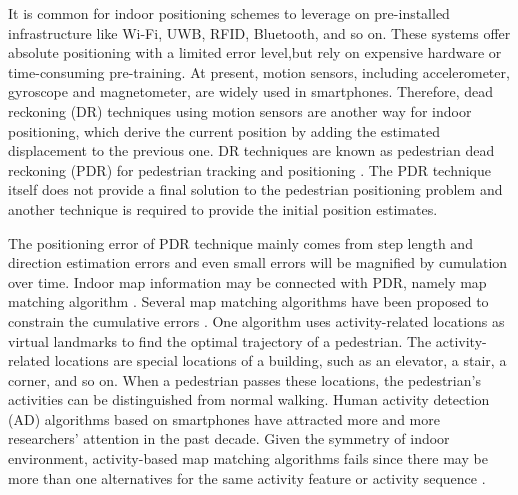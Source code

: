 \documentclass[conference]{IEEEtran}
\begin{document}
It is common for indoor positioning schemes to leverage on pre-installed infrastructure like Wi-Fi\cite{bahl2000enhancements}, UWB\cite{Fontana2002}, RFID\cite{ni2004landmarc}, Bluetooth\cite{zafari2015enhancing}, and so on. These systems offer absolute positioning with a limited error level,but rely on expensive hardware or time-consuming pre-training. At present, motion sensors, including accelerometer, gyroscope and magnetometer, are widely used in smartphones. Therefore, dead reckoning (DR) techniques using motion sensors are another way for indoor positioning, which derive the current position by adding the estimated displacement to the previous one. DR techniques are known as  pedestrian dead reckoning (PDR) for pedestrian tracking and positioning \cite{fu2017crowdsourcing,alaoui2017points,zhou2015activity}. The PDR technique itself does not provide a final solution to the pedestrian positioning problem and another technique is required to provide the initial position estimates.

The positioning error of PDR technique mainly comes from step length and direction estimation errors and even small errors will be magnified by cumulation over time. Indoor map information may be connected with PDR, namely map matching algorithm \cite{aly2015semmatch}. Several map matching algorithms have been proposed to constrain the cumulative errors \cite{zhou2015activity,aly2015semmatch,zhou2015alimc,abdelnasser2016semanticslam,qiu2017iframe}.  One algorithm uses activity-related locations as virtual landmarks to find the optimal trajectory of a pedestrian. The activity-related locations are special locations of a building, such as an elevator, a stair, a corner, and so on. When a pedestrian passes these locations, the pedestrian's activities can be distinguished from normal walking. Human activity detection (AD) algorithms based on smartphones have attracted more and more researchers' attention in the past decade. Given the symmetry of indoor environment, activity-based map matching algorithms fails since there may be more than one alternatives for the same activity feature or activity sequence \cite{zhou2015activity}.
\end{document}
